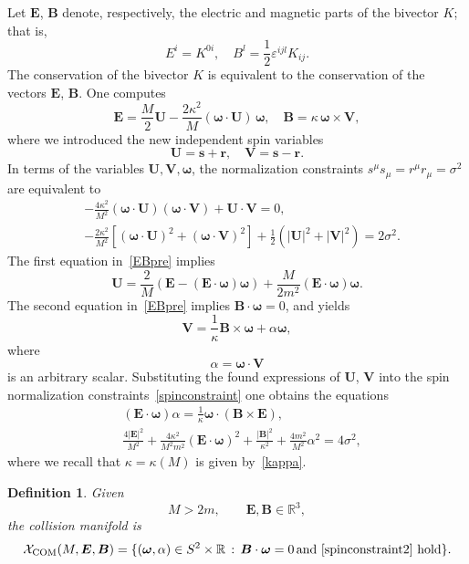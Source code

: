 \documentclass[10pt,a4paper]{amsart}
\newtheorem{definition}[theorem]{Definition}
\newcommand{\R}{\mathbb{R}}
\begin{document}
Let $\bm E$, $\bm B$ denote, respectively, the electric and magnetic parts of the bivector $K$; that is,
\[
E^i=K^{0i},\quad B^l=\frac{1}{2}\varepsilon^{ijl}K_{ij}.
\]
The conservation of the bivector $K$ is equivalent to the conservation of the vectors $\bm E$, $\bm B$. 
One computes
\begin{equation}\label{EBpre}
\bm E=\frac{M}{2}{\bm U}-\frac{2\kappa^2}{M}(\bm \omega \cdot \bm U)\,\bm \omega ,\quad \bm B=\kappa\, \bm \omega \times \bm V,
\end{equation}
where we introduced the new independent spin variables
\begin{equation}\label{UV}
\bm U=\bm s+\bm r,\quad \bm V=\bm s-\bm r.
\end{equation}
In terms of the variables ${\bm U}, {\bm V}, {\bm \omega}$, the normalization constraints $s^\mu s_\mu=r^\mu r_\mu =\sigma^2$ are equivalent to
\begin{subequations}\label{spinconstraint}
\begin{align}
&-\frac{4\kappa^2}{M^2}({\bm \omega}\cdot{\bm U})({\bm \omega}\cdot{\bm V})+{\bm U}\cdot{\bm V}=0,\\
&-\frac{2\kappa^2}{M^2}[({\bm \omega}\cdot{\bm U})^2+({\bm \omega}\cdot{\bm V})^2]+\frac{1}{2}(|{\bm U}|^2+|{\bm V}|^2)=2\sigma^2.
\end{align}
\end{subequations}
The first equation in~\eqref{EBpre} implies
\begin{equation}\label{Uprime}
{\bm U}=\frac2M\left({\bm E}-({\bm E}\cdot \bm \omega  )\bm \omega  \right)+\frac{M}{2m^2}({\bm E}\cdot \bm \omega  )\bm \omega  .
\end{equation}
The second equation in~\eqref{EBpre} implies ${\bm B}\cdot \bm \omega  =0$, and yields
\begin{equation}\label{Vprime}
{\bm V}= \frac1\kappa {\bm B}\times \bm \omega  +\alpha \bm \omega  ,
\end{equation}
where
\begin{equation}\label{alpha}
\alpha=\bm \omega  \cdot {\bm V}
\end{equation}
is an arbitrary scalar.
Substituting the found expressions of ${\bm U}$, ${\bm V}$ into the spin normalization constraints~\eqref{spinconstraint} one obtains the equations
\begin{subequations}\label{spinconstraint2}
\begin{align}
&({\bm E}\cdot \bm \omega  )\alpha=\frac1\kappa \bm \omega  \cdot({\bm B}\times {\bm E}),\label{first}\\
&\frac{4|{\bm E}|^2}{M^2}+\frac{4\kappa^2}{M^2m^2}({\bm E}\cdot \bm \omega  )^2+\frac{|{\bm B}|^2}{\kappa^2}+\frac{4m^2}{M^2}\alpha^2=4\sigma^2\label{second},
\end{align}
\end{subequations}
where we recall that $\kappa=\kappa(M)$ is given by~\eqref{kappa}. 
\begin{definition}
Given
\[
M>2m,\qquad{\bm E},{\bm B}\in\mathbb R^3,
\]
the collision manifold is
\[
\mathcal{X}_\mathrm{COM}(M,{\bm E}, {\bm B})=\{(\bm\omega,\alpha)\in S^2\times\R\, :\, {\bm B}\cdot\bm\omega=0\,\text{and~\eqref{spinconstraint2} hold}\}.
\]
\end{definition}
\end{document}
